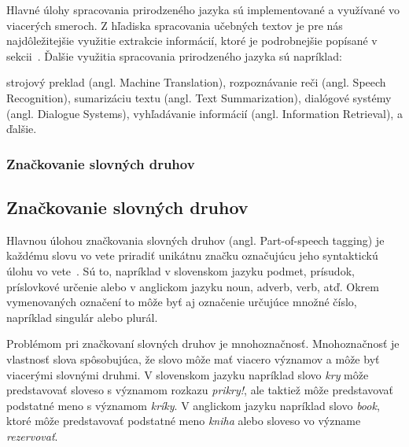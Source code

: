 Hlavné úlohy spracovania prirodzeného jazyka sú implementované a využívané vo viacerých smeroch. Z hľadiska spracovania učebných textov je pre nás najdôležitejšie využitie extrakcie informácií, ktoré je podrobnejšie popísané v sekcii~. Ďalšie využitia spracovania prirodzeného jazyka sú napríklad:~\cite{Preeti}
\begin{my_itemize}
	\myitem strojový preklad (angl. Machine Translation),
	\myitem rozpoznávanie reči (angl. Speech Recognition),
	\myitem sumarizáciu textu (angl. Text Summarization),
	\myitem dialógové systémy (angl. Dialogue Systems),
	\myitem vyhľadávanie informácií (angl. Information Retrieval),
	\myitem a ďalšie.
\end{my_itemize}

%
%
{
	\subsubsection{Značkovanie slovných druhov}
}
{
	\subsection{Značkovanie slovných druhov}
}
\label{subsubsec:postagging}
Hlavnou úlohou značkovania slovných druhov (angl. Part-of-speech tagging) je každému slovu vo vete priradiť unikátnu značku označujúcu jeho syntaktickú úlohu vo vete~\cite{collobert2011}. Sú to, napríklad v slovenskom jazyku podmet, prísudok, príslovkové určenie alebo v anglickom jazyku noun, adverb, verb, atď. Okrem vymenovaných označení to môže byť aj označenie určujúce množné číslo, napríklad singulár alebo plurál.

Problémom pri značkovaní slovných druhov je mnohoznačnosť. Mnohoznačnosť je vlastnosť slova spôsobujúca, že slovo môže mať viacero významov a môže byť viacerými slovnými druhmi. V slovenskom jazyku napríklad slovo \textit{kry} môže predstavovať sloveso s významom rozkazu \textit{prikry!}, ale taktiež môže predstavovať podstatné meno s významom \textit{kríky}. V anglickom jazyku napríklad slovo \textit{book}, ktoré môže predstavovať podstatné meno \textit{kniha} alebo sloveso vo význame \textit{rezervovať}.

